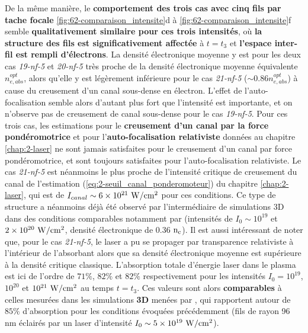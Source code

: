 \begin{refsection}
De la même manière, le \textbf{comportement des trois cas avec cinq fils par tache focale} \ref{fig:62-comparaison_intensite}d à \ref{fig:62-comparaison_intensite}f semble \textbf{qualitativement similaire pour ces trois intensités}, où \textbf{la structure des fils est significativement affectée} à $t=t_3$ et \textbf{l'espace inter-fil est rempli d'électrons}. La densité électronique moyenne y est pour les deux cas \textit{19-nf-5} et \textit{20-nf-5} très proche de la densité électronique moyenne équivalente $n_{e,abs}^{opt}$, alors qu'elle y est légèrement inférieure pour le cas \textit{21-nf-5} ($\sim 0.86 n_{e,abs}^{opt}$) à cause du creusement d'un canal sous-dense en électron. L'effet de l'auto-focalisation semble alors d'autant plus fort que l'intensité est importante, et on n'observe pas de creusement de canal sous-dense pour le cas \textit{19-nf-5}. Pour ces trois cas, les estimations pour le \textbf{creusement d'un canal par la force pondéromotrice} et pour l'\textbf{auto-focalisation relativiste} données au chapitre \ref{chap:2-laser} ne sont jamais satisfaites pour le creusement d'un canal par force pondéromotrice, et sont toujours satisfaites pour l'auto-focalisation relativiste. Le cas \textit{21-nf-5} est néanmoins le plus proche de l'intensité critique de creusement du canal de l'estimation (\ref{eq:2-seuil_canal_ponderomoteur}) du chapitre \ref{chap:2-laser}, qui est de $I_{canal} \sim 6 \times 10^{21} ~ \rm W/cm^2$ pour ces conditions. Ce type de structure a néanmoins déjà été observé par l'intermédiaire de simulations 3D dans des conditions comparables notamment par \cite{pukhov_1996} (intensités de $I_0 \sim 10^{19}$ et $2 \times 10^{20} ~ \rm W/cm^2$, densité électronique de 0.36 $\rm n_c$). Il est aussi intéressant de noter que, pour le cas \textit{21-nf-5}, le laser a pu se propager par transparence relativiste à l'intérieur de l'absorbant alors que sa densité électronique moyenne est supérieure à la densité critique classique. L'absorption totale d'énergie laser dans le plasma est ici de l'ordre de $71\%$, $82\%$ et $82\%$ respectivement pour les intensités $I_0=10^{19}$, $10^{20}$ et $10^{21} ~ \rm W/cm^2$ au temps $t=t_3$. Ces valeurs sont alors \textbf{comparables} à celles mesurées dans les simulations \textbf{3D} menées par \cite{fedeli_2018c}, qui rapportent autour de $85\%$ d'absorption pour les conditions évoquées précédemment (fils de rayon 96 nm éclairés par un laser d'intensité $I_0 \sim 5 \times 10^{19} ~ \rm W/cm^2$).


\end{refsection}
